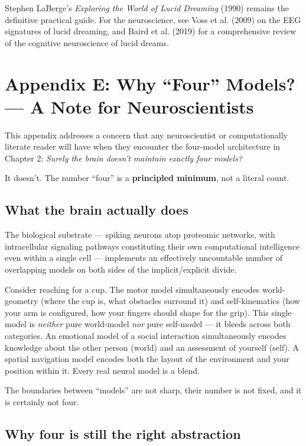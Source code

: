 \documentclass[11pt, twoside, openright]{book}
\begin{document}
Stephen LaBerge's \textit{Exploring the World of Lucid Dreaming} (1990) remains the definitive practical guide. For the neuroscience, see Voss et al. (2009) on the EEG signatures of lucid dreaming, and Baird et al. (2019) for a comprehensive review of the cognitive neuroscience of lucid dreams.


\chapter*{Appendix E: Why ``Four'' Models? --- A Note for Neuroscientists}

This appendix addresses a concern that any neuroscientist or computationally literate reader will have when they encounter the four-model architecture in Chapter 2: \textit{Surely the brain doesn't maintain exactly four models?}

It doesn't. The number ``four'' is a \textbf{principled minimum}, not a literal count.

\section*{What the brain actually does}

The biological substrate --- spiking neurons atop proteomic networks, with intracellular signaling pathways constituting their own computational intelligence even within a single cell --- implements an effectively uncountable number of overlapping models on both sides of the implicit/explicit divide.

Consider reaching for a cup. The motor model simultaneously encodes world-geometry (where the cup is, what obstacles surround it) and self-kinematics (how your arm is configured, how your fingers should shape for the grip). This single model is \textit{neither} pure world-model \textit{nor} pure self-model --- it bleeds across both categories. An emotional model of a social interaction simultaneously encodes knowledge about the other person (world) and an assessment of yourself (self). A spatial navigation model encodes both the layout of the environment and your position within it. Every real neural model is a blend.

The boundaries between ``models'' are not sharp, their number is not fixed, and it is certainly not four.

\section*{Why four is still the right abstraction}
\end{document}
